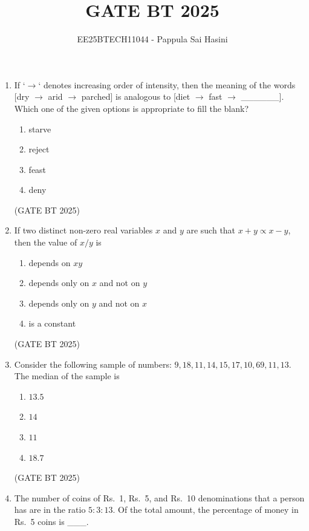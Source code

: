 \documentclass[journal,12pt,onecolumn]{IEEEtran}
\theoremstyle{remark}
\begin{document}
\title{GATE BT 2025}
\author{EE25BTECH11044 - Pappula Sai Hasini}
\maketitle
\renewcommand{\thefigure}{\theenumi}
\renewcommand{\thetable}{\theenumi}
\begin{enumerate}
\item
If `$\rightarrow$` denotes increasing order of intensity, then the meaning of the words [dry $\rightarrow$ arid $\rightarrow$ parched] is analogous to [diet $\rightarrow$ fast $\rightarrow$ \_\_\_\_\_\_]. Which one of the given options is appropriate to fill the blank?
\begin{enumerate}
   \item starve 
   \item reject 
   \item feast 
   \item deny 
\end{enumerate}
\hfill(GATE BT 2025)


\item 
If two distinct non-zero real variables $x$ and $y$ are such that $x+y \propto x-y$, then the value of $x/y$ is

\begin{enumerate}
    \item depends on $xy$
    \item depends only on $x$ and not on $y$
    \item depends only on $y$ and not on $x$
    \item is a constant
\end{enumerate}
\hfill(GATE BT 2025)

\item 
Consider the following sample of numbers: $9, 18, 11, 14, 15, 17, 10, 69, 11, 13$. The median of the sample is

\begin{enumerate}
    \item $13.5$
    \item $14$
    \item $11$
    \item $18.7$
\end{enumerate}
\hfill(GATE BT 2025)

\item The number of coins of Rs.~1, Rs.~5, and Rs.~10 denominations that a person has are in the ratio $5:3:13$. Of the total amount, the percentage of money in Rs.~5 coins is \_\_\_.


\end{enumerate}
\end{document}
